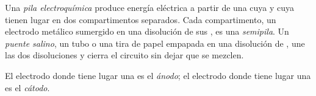 \begin{definition}\label{def:g12:cells-and-electrolysis:cell}
Una \emph{pila electroquímica} produce
energía eléctrica a partir de una  cuya  y cuya
 tienen lugar en dos compartimentos separados. Cada
compartimento, un electrodo metálico sumergido en una disolución de sus
, es una \emph{semipila}. Un \emph{puente
salino}, un tubo o una tira de papel empapada en una
disolución de , une las dos disoluciones y cierra el circuito sin
dejar que se mezclen.
\end{definition}

\begin{definition}\label{def:g12:cells-and-electrolysis:anode}
El electrodo donde tiene lugar una  es el
\emph{ánodo}; el electrodo donde tiene lugar una 
es el \emph{cátodo}.
\end{definition}

